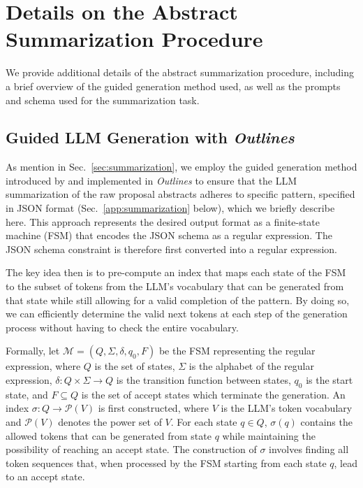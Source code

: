 \documentclass{article} %
\newcommand{\package}[1]{\textsl{#1}\xspace}
\begin{document}



\appendix

\section{Details on the Abstract Summarization Procedure}

We provide additional details of the abstract summarization procedure, including a brief overview of the guided generation method used, as well as the prompts and schema used for the summarization task.

\subsection{Guided LLM Generation with \package{Outlines}}
\label{app:guided-generation}

As mention in Sec.~\ref{sec:summarization}, we employ the guided generation method introduced by \citet{willard2023efficient} and implemented in \package{Outlines} to ensure that the LLM summarization of the raw proposal abstracts adheres to specific pattern, specified in JSON format (Sec.~\ref{app:summarization} below), which we briefly describe here. This approach represents the desired output format as a finite-state machine (FSM) that encodes the JSON schema as a regular expression. The JSON schema constraint is therefore first converted into a regular expression.

The key idea then is to pre-compute an index that maps each state of the FSM to the subset of tokens from the LLM's vocabulary that can be generated from that state while still allowing for a valid completion of the pattern. By doing so, we can efficiently determine the valid next tokens at each step of the generation process without having to check the entire vocabulary.

Formally, let $\mathcal{M} = (Q, \Sigma, \delta, q_0, F)$ be the FSM representing the regular expression, where $Q$ is the set of states, $\Sigma$ is the alphabet of the regular expression, $\delta: Q \times \Sigma \rightarrow Q$ is the transition function between states, $q_0$ is the start state, and $F\subseteq Q$ is the set of accept states which terminate the generation. An index $\sigma: Q \rightarrow \mathcal{P}(V)$ is first constructed, where $V$ is the LLM's token vocabulary and $\mathcal{P}(V)$ denotes the power set of $V$. For each state $q \in Q$, $\sigma(q)$ contains the allowed tokens that can be generated from state $q$ while maintaining the possibility of reaching an accept state. The construction of $\sigma$ involves finding all token sequences that, when processed by the FSM starting from each state $q$, lead to an accept state.
\end{document}
